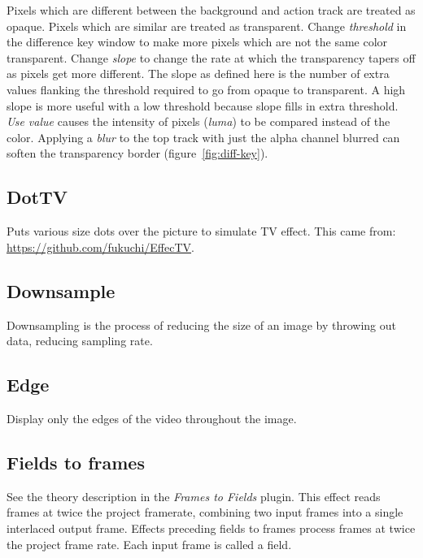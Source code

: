 Pixels which are different between the background and action track are treated as opaque. Pixels which are similar are treated as transparent. Change \textit{threshold} in the difference key window to make more pixels which are not the same color transparent. Change \textit{slope} to change the rate at which the transparency tapers off as pixels get more different. The slope as defined here is the number of extra values flanking the threshold required to go from opaque to transparent. A high slope is more useful with a low threshold because slope fills in extra threshold.
\textit{Use value} causes the intensity of pixels (\textit{luma}) to be compared instead of the color. Applying a \textit{blur} to the top track with just the alpha channel blurred can soften the transparency border (figure~\ref{fig:diff-key}).

\subsection{DotTV}%
\label{sub:dottv}

Puts various size dots over the picture to simulate TV effect. This came from: {\small \url{https://github.com/fukuchi/EffecTV}}.

\subsection{Downsample}%
\label{sub:downsample}

Downsampling is the process of reducing the size of an image by throwing out data, reducing sampling rate.

\subsection{Edge}%
\label{sub:edge}

Display only the edges of the video throughout the image.

\subsection{Fields to frames}%
\label{sub:fields_to_frames}

See the theory description in the \textit{Frames to Fields} plugin. This effect reads frames at twice the project framerate, combining two input frames into a single interlaced output frame. Effects preceding fields to frames process frames at twice the project frame rate. Each input frame is called a field.

